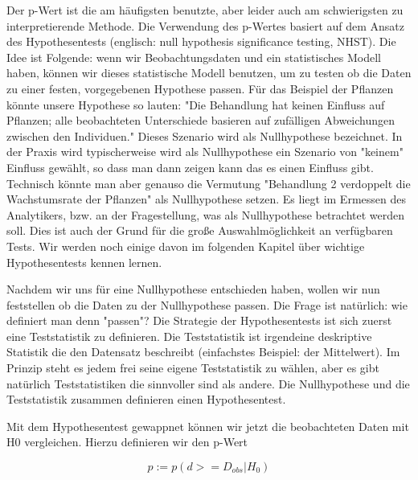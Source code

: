 \documentclass[a4paper,twoside]{tufte-book}\usepackage[]{graphicx}\usepackage[]{color}
\begin{document}
Der p-Wert ist die am häufigsten benutzte, aber leider auch am schwierigsten zu interpretierende Methode. Die Verwendung des p-Wertes basiert auf dem Ansatz des Hypothesentests (englisch: null hypothesis significance testing, NHST). Die Idee ist Folgende: wenn wir Beobachtungsdaten und ein statistisches Modell haben, können wir dieses statistische Modell benutzen, um zu testen ob die Daten zu einer festen, vorgegebenen Hypothese passen. Für das Beispiel der Pflanzen könnte unsere Hypothese so lauten: "Die Behandlung hat keinen Einfluss auf Pflanzen; alle beobachteten Unterschiede basieren auf zufälligen Abweichungen zwischen den Individuen." Dieses Szenario wird als Nullhypothese bezeichnet.  In der Praxis wird typischerweise wird als Nullhypothese ein Szenario von "keinem" Einfluss gewählt, so dass man dann zeigen kann das es einen Einfluss gibt. Technisch könnte man aber genauso die Vermutung "Behandlung 2 verdoppelt die Wachstumsrate der Pflanzen" als Nullhypothese setzen. Es liegt im Ermessen des Analytikers, bzw. an der Fragestellung, was als Nullhypothese betrachtet werden soll. Dies ist auch der Grund für die große Auswahlmöglichkeit an verfügbaren Tests. Wir werden noch einige davon im folgenden Kapitel über wichtige Hypothesentests kennen lernen.

Nachdem wir uns für eine Nullhypothese entschieden haben, wollen wir nun feststellen ob die Daten zu der Nullhypothese passen. Die Frage ist natürlich: wie definiert man denn "passen"? Die Strategie der Hypothesentests ist sich zuerst eine Teststatistik zu definieren. Die Teststatistik ist irgendeine deskriptive Statistik die den Datensatz beschreibt (einfachstes Beispiel: der Mittelwert). Im Prinzip steht es jedem frei seine eigene Teststatistik zu wählen, aber es gibt natürlich Teststatistiken die sinnvoller sind als andere. Die Nullhypothese und die Teststatistik zusammen definieren einen Hypothesentest. 

Mit dem Hypothesentest gewappnet können wir jetzt die beobachteten Daten mit H0 vergleichen. Hierzu definieren wir den p-Wert  

\begin{equation}
p := p(d >= D_{obs} | H_0)
\end{equation}
\end{document}
